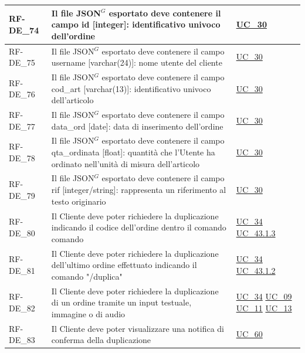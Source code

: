 \begin{longtable}{|>{\raggedright}p{}|>{\raggedright\arraybackslash}p{}|>{\raggedright\arraybackslash}p{}|}
	\hline
	RF-DE\_74 \hypertarget{rf-de_74} & Il file JSON$^G$ esportato deve contenere il campo id [integer]: identificativo univoco dell'ordine & \hyperref[uc_30]{UC\_30} \\
	\hline
	RF-DE\_75 \hypertarget{rf-de_75} & Il file JSON$^G$ esportato deve contenere il campo username [varchar(24)]: nome utente del cliente & \hyperref[uc_30]{UC\_30} \\
	\hline
	RF-DE\_76 \hypertarget{rf-de_76} & Il file JSON$^G$ esportato deve contenere il campo cod\_art [varchar(13)]: identificativo univoco dell'articolo & \hyperref[uc_30]{UC\_30} \\
	\hline
	RF-DE\_77 \hypertarget{rf-de_77} & Il file JSON$^G$ esportato deve contenere il campo data\_ord [date]: data di inserimento dell'ordine & \hyperref[uc_30]{UC\_30} \\
	\hline
	RF-DE\_78 \hypertarget{rf-de_78} & Il file JSON$^G$ esportato deve contenere il campo qta\_ordinata [float]: quantità che l'Utente ha ordinato nell'unità di misura dell'articolo & \hyperref[uc_30]{UC\_30} \\
	\hline
	RF-DE\_79 \hypertarget{rf-de_79} & Il file JSON$^G$ esportato deve contenere il campo rif [integer/string]: rappresenta un riferimento al testo originario & \hyperref[uc_30]{UC\_30} \\
	\hline
	RF-DE\_80 \hypertarget{rf-de_80} & Il Cliente deve poter richiedere la duplicazione indicando il codice dell'ordine dentro il comando comando \vr{/duplica\{xx\}} & \hyperref[uc_34]{UC\_34} \newline \hyperref[uc_43.1.3]{UC\_43.1.3} \\
	\hline
	RF-DE\_81 \hypertarget{rf-de_81} & Il Cliente deve poter richiedere la duplicazione dell'ultimo ordine effettuato indicando il comando "/duplica" & \hyperref[uc_34]{UC\_34} \newline \hyperref[uc_43.1.2]{UC\_43.1.2} \\
	\hline
	RF-DE\_82 \hypertarget{rf-de_82} & Il Cliente deve poter richiedere la duplicazione di un ordine tramite un input testuale, immagine o di audio & \hyperref[uc_34]{UC\_34} \newline \hyperref[uc_09]{UC\_09} \newline \hyperref[uc_11]{UC\_11} \newline \hyperref[uc_13]{UC\_13} \\
	\hline
	RF-DE\_83 \hypertarget{rf-de_83} & Il Cliente deve poter visualizzare una notifica di conferma della duplicazione & \hyperref[uc_60]{UC\_60} \\

\end{longtable}

